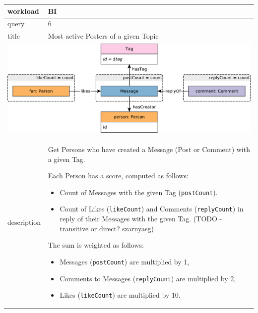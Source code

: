 \renewcommand*{\arraystretch}{1.1}

\noindent\begin{tabularx}{17cm}{|p{1.95cm}|X|}
	\hline
	workload    & BI \\ \hline
%
	query       & 6 \\ \hline
%
	title       & Most active Posters of a given Topic \\ \hline
	\multicolumn{2}{|c|}{ \includegraphics[scale=\patternscale,margin=0cm .2cm]{patterns/bi06}} \\ \hline
	description & Get Persons who have created a Message (Post or Comment) with a given
Tag.

Each Person has a score, computed as follows:

\begin{itemize}
\tightlist
\item
  Count of Messages with the given Tag (\texttt{postCount}).
\item
  Count of Likes (\texttt{likeCount}) and Comments (\texttt{replyCount})
  in reply of their Messages with the given Tag. (TODO - transitive or
  direct? szarnyasg)
\end{itemize}

The sum is weighted as follows:

\begin{itemize}
\tightlist
\item
  Messages (\texttt{postCount}) are multiplied by 1,
\item
  Comments to Messages (\texttt{replyCount}) are multiplied by 2,
\item
  Likes (\texttt{likeCount}) are multiplied by 10.
\end{itemize}
 \\ \hline
	

\end{tabularx}
